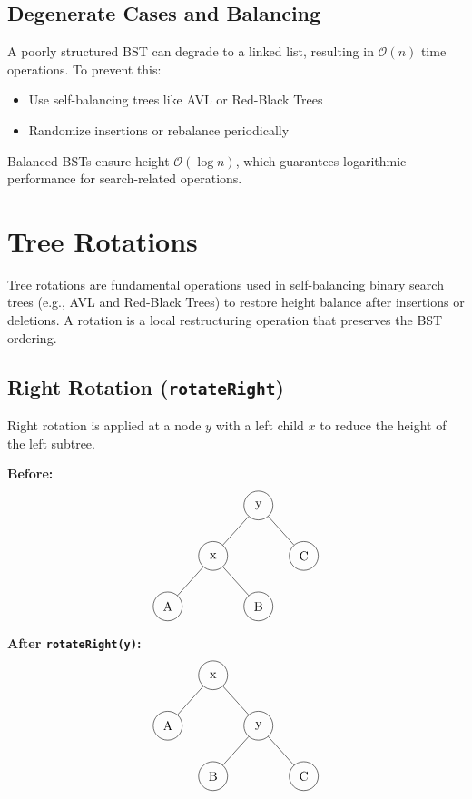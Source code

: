 \documentclass{article}
\begin{document}
\subsection{Degenerate Cases and Balancing}

A poorly structured BST can degrade to a linked list, resulting in $\mathcal{O}(n)$ time operations. To prevent this:

\begin{itemize}
  \item Use self-balancing trees like AVL or Red-Black Trees
  \item Randomize insertions or rebalance periodically
\end{itemize}

Balanced BSTs ensure height $\mathcal{O}(\log n)$, which guarantees logarithmic performance for search-related operations.

\section{Tree Rotations}

Tree rotations are fundamental operations used in self-balancing binary search trees (e.g., AVL and Red-Black Trees) to restore height balance after insertions or deletions. A rotation is a local restructuring operation that preserves the BST ordering.

\subsection{Right Rotation (\texttt{rotateRight})}

Right rotation is applied at a node $y$ with a left child $x$ to reduce the height of the left subtree.

\textbf{Before:}
\[
\begin{tikzpicture}[
  every node/.style={circle, draw, minimum size=0.8cm},
  level distance=1.4cm,
  level 1/.style={sibling distance=2.5cm}
]
\node (y) {y}
  child {node (x) {x}
    child {node {A}}
    child {node {B}}
  }
  child {node {C}};
\end{tikzpicture}
\]

\textbf{After \texttt{rotateRight(y)}:}
\[
\begin{tikzpicture}[
  every node/.style={circle, draw, minimum size=0.8cm},
  level distance=1.4cm,
  level 1/.style={sibling distance=2.5cm}
]
\node (x) {x}
  child {node {A}}
  child {node (y) {y}
    child {node {B}}
    child {node {C}}
  };
\end{tikzpicture}
\]
\end{document}

